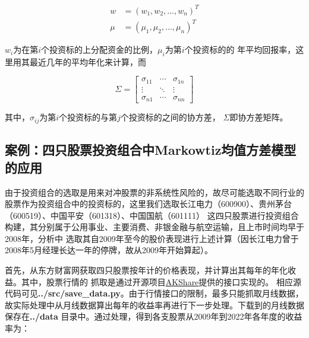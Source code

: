 \documentclass[UTF8]{ctexart}
\numberwithin{figure}{section}
\numberwithin{table}{section}
\numberwithin{equation}{section}
\begin{document}
        \begin{equation}
            \begin{aligned}
                w &= (w_1, w_2, \ldots, w_n)^T \\
                \mu &= (\mu_1, \mu_2, \ldots, \mu_n)^T
            \end{aligned}
        \end{equation}

        $w_i$为在第$i$个投资标的上分配资金的比例，$\mu_i$为第$i$个投资标的的
    年平均回报率，这里用其最近几年的平均年化来计算，而 

    \begin{equation}
        \Sigma=\left[\begin{array}{ccc}
        \sigma_{11} & \cdots & \sigma_{1 n} \\
        \vdots & \ddots & \vdots \\
        \sigma_{n 1} & \cdots & \sigma_{n n}
        \end{array}\right]
    \end{equation}

        其中，$\sigma_{ij}$为第$i$个投资标的与第$j$个投资标的之间的协方差，
    $\Sigma$即协方差矩阵。

    \subsection{案例：四只股票投资组合中Markowtiz均值方差模型的应用}

        由于投资组合的选取是用来对冲股票的非系统性风险的，故尽可能选取不同行业的
    股票作为投资组合中的投资标的，这里我们选取长江电力（600900）、贵州茅台（600519）、中国平安（601318）、中国国航（601111）
    这四只股票进行投资组合构建，其分别属于公用事业、主要消费、非银金融与航空运输，且上市时间均早于2008年，分析中
    选取其自2009年至今的股价表现进行上述计算（因长江电力曾于2008年5月经理长达一年的停牌，故从2009年开始算起）。

        首先，从东方财富网获取四只股票按年计的价格表现，并计算出其每年的年化收益。其中，股票行情的
    抓取是通过开源项目\href{https://akshare.akfamily.xyz/index.html}{AKShare}提供的接口实现的。
    相应源代码可见\textbf{../src/save\_data.py}。由于行情接口的限制，最多只能抓取月线数据，
    故实际处理中从月线数据算出每年的收益率再进行下一步处理。下载到的月线数据保存在\textbf{../data}
    目录中。通过处理，得到各支股票从2009年到2022年各年度的收益率为：
\end{document}
